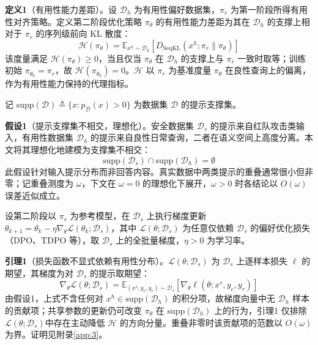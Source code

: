 \documentclass[lettersize,journal]{IEEEtran}
\begin{document}
\textbf{定义1}（有用性能力差距）。设 $\mathcal{D}_h$ 为有用性偏好数据集，$\pi_r$ 为第一阶段所得有用性对齐策略。定义第二阶段优化策略 $\pi_\theta$ 的有用性能力差距为其在 $\mathcal{D}_h$ 的支撑上相对于 $\pi_r$ 的序列级前向 KL 散度：
\begin{equation}
    \mathcal{H}(\pi_\theta) = \mathbb{E}_{x^h \sim \mathcal{D}_h}
    \left[ D_{\mathrm{SeqKL}}\left(x^h; \pi_r \| \pi_\theta \right) \right]
\end{equation}
该度量满足 $\mathcal{H}(\pi_\theta) \geq 0$，当且仅当 $\pi_\theta$ 在 $\mathcal{D}_h$ 的支撑上与 $\pi_r$ 一致时取等；训练初始 $\pi_{\theta_0} = \pi_r$，故 $\mathcal{H}(\pi_{\theta_0}) = 0$。$\mathcal{H}$ 以 $\pi_r$ 为基准度量 $\pi_\theta$ 在良性查询上的偏离，作为有用性能力保持的代理指标。

记 $\mathrm{supp}(\mathcal{D}) \triangleq \{x : p_\mathcal{D}(x) > 0\}$ 为数据集 $\mathcal{D}$ 的提示支撑集。

\textbf{假设1}\label{jiashe1}（提示支撑集不相交，理想化）。安全数据集 $\mathcal{D}_s$ 的提示来自红队攻击类输入，有用性数据集 $\mathcal{D}_h$ 的提示来自良性日常查询，二者在语义空间上高度分离。本文将其理想化地建模为支撑集不相交：
\begin{equation}
    \mathrm{supp}(\mathcal{D}_s) \cap \mathrm{supp}(\mathcal{D}_h) = \emptyset
\end{equation}
此假设针对输入提示分布而非回答内容。真实数据中两类提示的重叠通常很小但非零；记重叠测度为 $\omega$，下文在 $\omega = 0$ 的理想化下展开，$\omega > 0$ 时各结论以 $O(\omega)$ 误差近似成立。

设第二阶段以 $\pi_r$ 为参考模型，在 $\mathcal{D}_s$ 上执行梯度更新 $\theta_{k+1} = \theta_k - \eta \nabla_\theta \mathcal{L}(\theta_k; \mathcal{D}_s)$，其中 $\mathcal{L}(\theta; \mathcal{D}_s)$ 为任意仅依赖 $\mathcal{D}_s$ 的偏好优化损失（DPO、TDPO 等），取 $\mathcal{D}_s$ 上的全批量梯度，$\eta > 0$ 为学习率。

\textbf{引理1}\label{gradient1}（损失函数不显式依赖有用性分布）。$\mathcal{L}(\theta; \mathcal{D}_s)$ 为 $\mathcal{D}_s$ 上逐样本损失 $\ell$ 的期望，其梯度为对 $\mathcal{D}_s$ 的提示取期望：
\begin{equation}
    \nabla_\theta \mathcal{L}(\theta; \mathcal{D}_s) = 
    \mathbb{E}_{(x^s, y_c, y_r) \sim \mathcal{D}_s}
    \left[\nabla_\theta \ell\left(\theta; x^s, y_c, y_r\right)\right]
\end{equation}
由假设1，上式不含任何对 $x^h \in \mathrm{supp}(\mathcal{D}_h)$ 的积分项，故梯度向量中无 $\mathcal{D}_h$ 样本的贡献项；共享参数的更新仍可改变 $\pi_\theta$ 在 $\mathrm{supp}(\mathcal{D}_h)$ 上的行为，引理1 仅排除$\mathcal{L}(\theta;\mathcal{D}_s)$中存在主动降低 $\mathcal{H}$ 的方向分量。重叠非零时该贡献项的范数以 $O(\omega)$ 为界。证明见附录\ref{app:3}。
\end{document}
